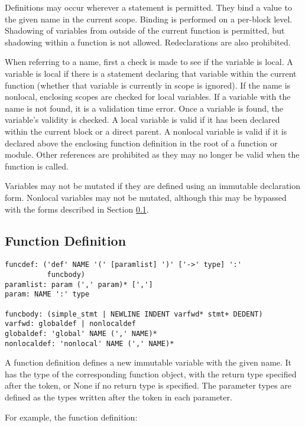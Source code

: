 Definitions may occur wherever a statement is permitted. They bind a value to
the given name in the current scope. Binding is performed on a per-block level.
Shadowing of variables from outside of the current function is permitted, but
shadowing within a function is not allowed. Redeclarations are also prohibited.

When referring to a name, first a check is made to see if the variable is local.
A variable is local if there is a statement declaring that variable within the
current function (whether that variable is currently in scope is ignored). If
the name is nonlocal, enclosing scopes are checked for local variables. If a
variable with the name is not found, it is a validation time error. Once a
variable is found, the variable's validity is checked. A local variable is valid
if it has been declared within the current block or a direct parent. A nonlocal
variable is valid if it is declared above the enclosing function definition in
the root of a function or module. Other references are prohibited as they may no
longer be valid when the function is called.

Variables may not be mutated if they are defined using an immutable declaration
form. Nonlocal variables may not be mutated, although this may be bypassed with
the  forms described in Section \ref{sec:funcdef}.

\subsection{Function Definition}
\label{sec:funcdef}

\begin{lstlisting}
funcdef: ('def' NAME '(' [paramlist] ')' ['->' type] ':'
          funcbody)
paramlist: param (',' param)* [',']
param: NAME ':' type

funcbody: (simple_stmt | NEWLINE INDENT varfwd* stmt+ DEDENT)
varfwd: globaldef | nonlocaldef
globaldef: 'global' NAME (',' NAME)*
nonlocaldef: 'nonlocal' NAME (',' NAME)*
\end{lstlisting}

A function definition defines a new immutable variable with the given name. It has
the type of the corresponding function object, with the return type specified
after the \code{->} token, or None if no return type is specified. The parameter
types are defined as the types written after the \code{:} token in each parameter.

For example, the function definition:


